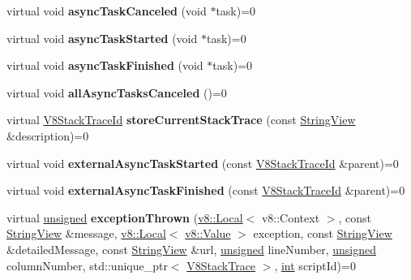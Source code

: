\begin{DoxyCompactItemize}
\item 
\mbox{\label{classv8__inspector_1_1V8Inspector_ad443be8234a20744558250b92451fc9d}} 
virtual void {\bfseries async\+Task\+Canceled} (void $\ast$task)=0
\item 
\mbox{\label{classv8__inspector_1_1V8Inspector_a18081a671c17b6c8cc9e827e834518fc}} 
virtual void {\bfseries async\+Task\+Started} (void $\ast$task)=0
\item 
\mbox{\label{classv8__inspector_1_1V8Inspector_aa19d6664fb011102014395d54d16ed68}} 
virtual void {\bfseries async\+Task\+Finished} (void $\ast$task)=0
\item 
\mbox{\label{classv8__inspector_1_1V8Inspector_a2a92520981e6d348ae004c6c72098975}} 
virtual void {\bfseries all\+Async\+Tasks\+Canceled} ()=0
\item 
\mbox{\label{classv8__inspector_1_1V8Inspector_af9682cd0e499d0d5e628c619b5efc382}} 
virtual \mbox{\hyperlink{structv8__inspector_1_1V8StackTraceId}{V8\+Stack\+Trace\+Id}} {\bfseries store\+Current\+Stack\+Trace} (const \mbox{\hyperlink{classv8__inspector_1_1StringView}{String\+View}} \&description)=0
\item 
\mbox{\label{classv8__inspector_1_1V8Inspector_afd1530d80ad0a5a8bb284fc5aeb32fef}} 
virtual void {\bfseries external\+Async\+Task\+Started} (const \mbox{\hyperlink{structv8__inspector_1_1V8StackTraceId}{V8\+Stack\+Trace\+Id}} \&parent)=0
\item 
\mbox{\label{classv8__inspector_1_1V8Inspector_a0968e8e70a8c9086b66e421e02db8a5e}} 
virtual void {\bfseries external\+Async\+Task\+Finished} (const \mbox{\hyperlink{structv8__inspector_1_1V8StackTraceId}{V8\+Stack\+Trace\+Id}} \&parent)=0
\item 
\mbox{\label{classv8__inspector_1_1V8Inspector_a71e69c7b3fbb5eb9c0b5272f6aab3a2d}} 
virtual \mbox{\hyperlink{classunsigned}{unsigned}} {\bfseries exception\+Thrown} (\mbox{\hyperlink{classv8_1_1Local}{v8\+::\+Local}}$<$ v8\+::\+Context $>$, const \mbox{\hyperlink{classv8__inspector_1_1StringView}{String\+View}} \&message, \mbox{\hyperlink{classv8_1_1Local}{v8\+::\+Local}}$<$ \mbox{\hyperlink{classv8_1_1Value}{v8\+::\+Value}} $>$ exception, const \mbox{\hyperlink{classv8__inspector_1_1StringView}{String\+View}} \&detailed\+Message, const \mbox{\hyperlink{classv8__inspector_1_1StringView}{String\+View}} \&url, \mbox{\hyperlink{classunsigned}{unsigned}} line\+Number, \mbox{\hyperlink{classunsigned}{unsigned}} column\+Number, std\+::unique\+\_\+ptr$<$ \mbox{\hyperlink{classv8__inspector_1_1V8StackTrace}{V8\+Stack\+Trace}} $>$, \mbox{\hyperlink{classint}{int}} script\+Id)=0

\end{DoxyCompactItemize}
